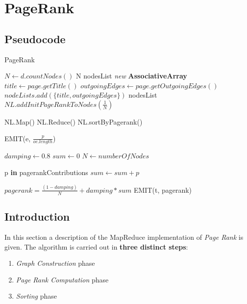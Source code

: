 \section{PageRank}

\subsection{Pseudocode}
\begin{algorithm}[H]
	\caption{PageRank}\label{General}
		\begin{algorithmic}[1]
			
				\State $N \gets d.countNodes()$
				\State \Return N
			\EndProcedure
\newline			
				\State nodesList \textit{new} \textbf{AssociativeArray}
					\State $title \gets page.getTitle()$
					\State $outgoingEdges \gets page.getOutgoingEdges()$
					\State $nodeLists.add(\{ title, outgoingEdges\}) $
				\EndFor
				\State \Return nodesList
			\EndProcedure
	\newline		
				\State $NL.addInitPageRankToNodes(\frac{1}{N})$
				
					\State NL.Map()
					\State NL.Reduce()
				\EndFor
				\State NL.sortByPagerank()
				
			\EndProcedure
\newline
					\State EMIT(e, $\frac{p}{oe.length}$)
				\EndFor
			\EndProcedure
						
				\State $damping \gets 0.8$
				\State $sum \gets 0$
				\State $N \gets numberOfNodes$
				
				\ForAll p \textbf{in} pagerankContributions
					\State $sum \gets sum + p$
				\EndFor
				
				\State $pagerank =  \frac{(1-damping)}{N} + damping*sum$
				\State EMIT(t, pagerank)
			\EndProcedure
	\end{algorithmic}
\end{algorithm}

\subsection{Introduction}
In this section a description of the MapReduce implementation of \textit{Page Rank} is given.
The algorithm is carried out in \textbf{three distinct steps}:
\begin{enumerate}
	\item \textit{Graph Construction} phase
	\item \textit{Page Rank Computation} phase
	\item \textit{Sorting} phase
\end{enumerate}

